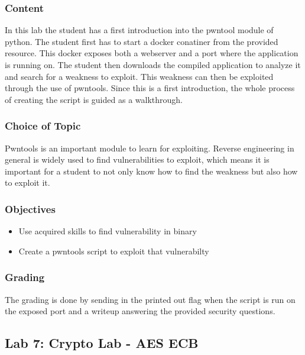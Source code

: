 \subsubsection*{Content}
In this lab the student has a first introduction into the pwntool module of python. The student first has to start a docker conatiner from the provided resource. This docker exposes both a webserver and a port where the application is running on. The student then downloads the compiled application to analyze it and search for a weakness to exploit. This weakness can then be exploited through the use of pwntools. Since this is a first introduction, the whole process of creating the script is guided as a walkthrough.
\subsubsection*{Choice of Topic}
Pwntools is an important module to learn for exploiting. Reverse engineering in general is widely used to find vulnerabilities to exploit, which means it is important for a student to not only know how to find the weakness but also how to exploit it.
\subsubsection*{Objectives}
\begin{itemize}
    \item Use acquired skills to find vulnerability in binary
    \item Create a pwntools script to exploit that vulnerabilty
\end{itemize}
\subsubsection*{Grading}
The grading is done by sending in the printed out flag when the script is run on the exposed port and a writeup answering the provided security questions.
\pagebreak

\subsection{Lab 7: Crypto Lab - AES ECB}
